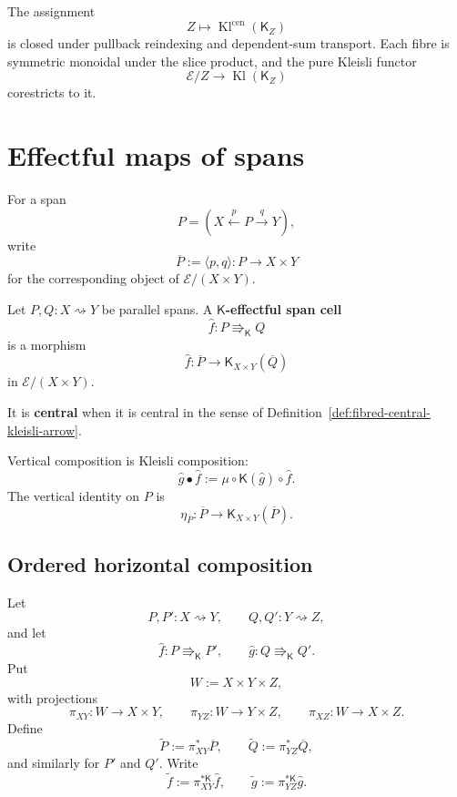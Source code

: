 \begin{corollary}
\label{cor:indexed-premonoidal-centre}
The assignment
\[
    Z\longmapsto
    \operatorname{Kl}^{\mathrm{cen}}(\mathsf K_Z)
\]
is closed under pullback reindexing and dependent-sum transport.  Each fibre
is symmetric monoidal under the slice product, and the pure Kleisli functor
\[
    \mathcal E/Z
    \longrightarrow
    \operatorname{Kl}(\mathsf K_Z)
\]
corestricts to it.
\end{corollary}

\section{Effectful maps of spans}
\label{sec:effectful-maps-of-spans}

For a span
\[
    P=
    \left(
        X\xleftarrow{p}P\xrightarrow{q}Y
    \right),
\]
write
\[
    \overline P
    :=
    \langle p,q\rangle:
    P\longrightarrow X\times Y
\]
for the corresponding object of \(\mathcal E/(X\times Y)\).

\begin{definition}
\label{def:effectful-span-cell}
Let \(P,Q:X\rightsquigarrow Y\) be parallel spans.  A
\textbf{\(\mathsf K\)-effectful span cell}
\[
    \widehat f:
    P\Rrightarrow_{\mathsf K}Q
\]
is a morphism
\[
    \widehat f:
    \overline P
    \longrightarrow
    \mathsf K_{X\times Y}(\overline Q)
\]
in \(\mathcal E/(X\times Y)\).

It is \textbf{central} when it is central in the sense of
Definition~\ref{def:fibred-central-kleisli-arrow}.
\end{definition}

Vertical composition is Kleisli composition:
\[
    \widehat g\bullet\widehat f
    :=
    \mu\circ\mathsf K(\widehat g)\circ\widehat f.
\]
The vertical identity on \(P\) is
\[
    \eta_{\overline P}:
    \overline P\longrightarrow
    \mathsf K_{X\times Y}(\overline P).
\]

\subsection{Ordered horizontal composition}
\label{subsec:ordered-horizontal-effectful-spans}

Let
\[
    P,P':X\rightsquigarrow Y,
    \qquad
    Q,Q':Y\rightsquigarrow Z,
\]
and let
\[
    \widehat f:P\Rrightarrow_{\mathsf K}P',
    \qquad
    \widehat g:Q\Rrightarrow_{\mathsf K}Q'.
\]
Put
\[
    W:=X\times Y\times Z,
\]
with projections
\[
    \pi_{XY}:W\to X\times Y,
    \qquad
    \pi_{YZ}:W\to Y\times Z,
    \qquad
    \pi_{XZ}:W\to X\times Z.
\]
Define
\[
    \widetilde P:=\pi_{XY}^*\overline P,
    \qquad
    \widetilde Q:=\pi_{YZ}^*\overline Q,
\]
and similarly for \(P'\) and \(Q'\).  Write
\[
    \widetilde f
    :=
    \pi_{XY}^{*\mathsf K}\widehat f,
    \qquad
    \widetilde g
    :=
    \pi_{YZ}^{*\mathsf K}\widehat g.
\]

